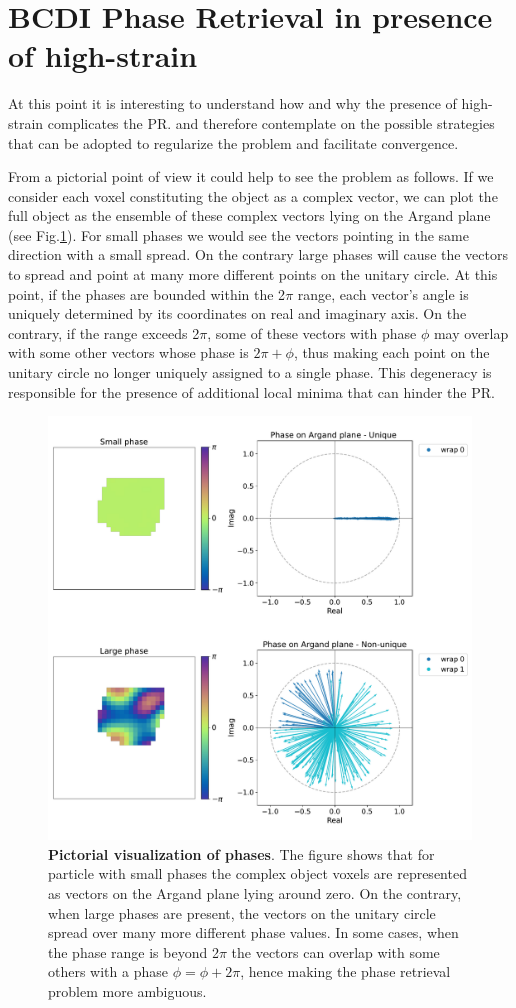\section{BCDI Phase Retrieval in presence of high-strain}

At this point it is interesting to understand how and why the presence of high-strain complicates the PR. 
and therefore contemplate on the possible strategies that can be adopted to regularize the problem and facilitate convergence. 

From a pictorial point of view it could help to see the problem as follows. If we consider each voxel constituting 
the object as a complex vector, we can plot the full object as the ensemble of these complex 
vectors lying on the Argand plane (see Fig.\ref{fig:argand}). For small phases we would see the vectors pointing in the same direction with a small 
spread. On the contrary large phases will cause the vectors to spread and point at many more different points on the 
unitary circle. At this point, if the phases are bounded within the 2$\pi$ range, each vector's angle is uniquely determined by 
its coordinates on real and imaginary axis. On the contrary, if the range exceeds 2$\pi$, some of these vectors with 
phase $\phi$ may overlap with some other vectors whose phase is $2\pi + \phi$, thus making each point on the unitary 
circle no longer uniquely assigned to a single phase. This degeneracy is responsible for the presence of additional 
local minima that can hinder the PR. 

\begin{figure}[H]
    \centering
    \includegraphics[width=.7\textwidth]{figures/Intro/phase_Argand.pdf}
    \caption{\textbf{Pictorial visualization of phases}. The figure shows that for particle with small phases the 
    complex object voxels are represented as vectors on the Argand plane lying around zero. On the contrary, when large 
    phases are present, the vectors on the unitary circle spread over many more different phase values. In some cases, 
    when the phase range is beyond 2$\pi$ the vectors can overlap with some others with a phase $\phi = \phi + 2\pi$, 
    hence making the phase retrieval problem more ambiguous.}
    \label{fig:argand}
\end{figure}

